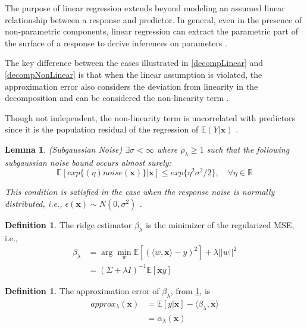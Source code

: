 \documentclass[nohyperref]{article}
\theoremstyle{plain}
\newtheorem{lemma}[theorem]{Lemma}
\theoremstyle{definition}
\newtheorem{definition}[theorem]{Definition}
\theoremstyle{remark}
\begin{document}
The purpose of linear regression extends beyond modeling an assumed linear relationship between a response and predictor. In general, even in the presence of non-parametric components, linear regression can extract the parametric part of the surface of a response to derive inferences on parameters \cite{BBBGPTZZ2014}. 

The key difference between the cases illustrated in \cref{decompLinear} and \cref{decompNonLinear} is that when the linear assumption is violated, the approximation error also considers the deviation from linearity in the decomposition and can be considered the non-linearity term \cite{BBBGPTZZ2014}. 

Though not independent, the non-linearity term is uncorrelated with predictors since it is the population residual of the regression of $\mathbb{E}(Y|\textbf{x})$ \cite{BBBGPTZZ2014}.

\begin{lemma}
\label{lem:subgaussianNoise}
(Subgaussian Noise) $\exists \sigma < \infty$ where $\rho_{\lambda} \geq 1$ such that the following subgaussian noise bound occurs almost surely:
$$\mathbb{E}[exp\{(\eta) noise(\textbf{x})\} | \textbf{x}] \leq exp\{\eta^2\sigma^2/2 \}, \quad \forall \eta \in \mathbb{R}$$

This condition is satisfied in the case when the response noise is normally distributed, i.e., $\epsilon(\textbf{x}) \sim N(0, \sigma^2)$ \cite{HKZ2014}.
\end{lemma}

\begin{definition}
\label{def:ridgeEstReg}
The ridge estimator $\beta_{\lambda}$ is the minimizer of the regularized MSE, i.e.,
\begin{align*}
    \beta_{\lambda} &= \arg \min_w \mathbb{E}[(\langle w, \textbf{x} \rangle - y)^2] + \lambda||w||^2 \\
    &= (\Sigma + \lambda I)^{-1} \mathbb{E}[\textbf{x}y]
\end{align*}
\end{definition}

\begin{definition}
\label{def:approxErrorReg}
The approximation error of $\beta_{\lambda}$, from \cref{def:ridgeEstReg}, is 
\begin{align*}
    approx_{\lambda}(\textbf{x}) &= \mathbb{E}[y|\textbf{x}] - \langle \beta_{\lambda}, \textbf{x} \rangle\\
    &= \alpha_{\lambda}(\textbf{x})
\end{align*}
\end{definition}
\end{document}
